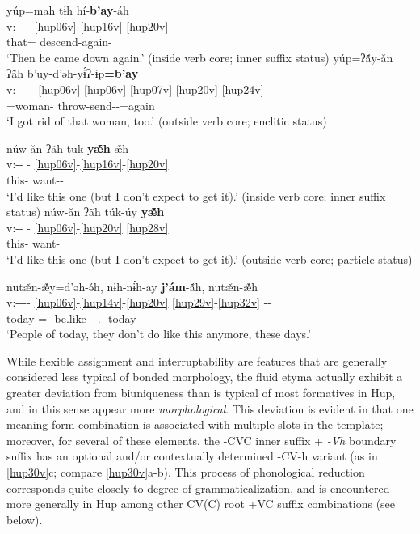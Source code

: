 \documentclass[output=paper]{langscibook}
\begin{document}
\ea\label{ex:hup:key:27}
    \ea\label{ex:hup:key:27a}{
    \glll yúp=mah tɨh hí-\textbf{b'ay}-áh\\ 
    v:{}-{}- -  \ref{hup06v}-\ref{hup16v}-\ref{hup20v}\\ 
    that=\Rep{} \Third\Sg{} descend-again-\Decl{}\\ 
    \glt `Then he came down again.' (inside verb core; inner suffix status)
    }
    \ex\label{ex:hup:key:27b}{
    \glll yúp=ʔ\'{ã}y-ǎn ʔãh b'uy-d'ǝh-yɨ́ʔ-ɨp\textbf{=b'ay}\\ 
    v:-{}-{}- - \ref{hup06v}-\ref{hup06v}-\ref{hup07v}-\ref{hup20v}-\ref{hup24v}\\ 
    \Dem{}=woman-\Obj{} \First\Sg{} throw-send-\Tel-\Dep{}=again\\  
    \glt `I got rid of that woman, too.' (outside verb core; enclitic status)
    }
    \z 
\z 

\ea\label{ex:hup:key:28} 
    \ea\label{ex:hup:key:28a}{
    \glll núw-ǎn ʔãh tuk-\textbf{yæ̃́́h}-æ̃́h\\ 
    v:-{}- - \ref{hup06v}-\ref{hup16v}-\ref{hup20v}\\ 
    this-\Obj{} \First\Sg{} want-\Frust-\Decl{}\\ 
    \glt `I'd like this one (but I don't expect to get it).' (inside verb core; inner suffix status)
    }
    \ex\label{ex:hup:key:28b}{
    \glll núw-ǎn ʔãh túk-úy \textbf{yæ̃́́h}\\ 
    v:-{}- - \ref{hup06v}-\ref{hup20v} \ref{hup28v}\\
    this-\Obj{} \First\Sg{} want-\Dynm{} \Frust{}\\
    \glt `I'd like this one (but I don't expect to get it).' (outside verb core; particle status)
    }
    \z 
\z 

\ea\label{ex:hup:key:29} 
\glll nutæ̌n-æ̃́y=d'ǝh-ǝ́h, nɨh-nɨ́h-ay \textbf{j'ám}-ã́h, nutæ̌n-æ̃́h	\\ 
v:-{}-{}-{}- \ref{hup06v}-\ref{hup14v}-\ref{hup20v} \ref{hup29v}-\ref{hup32v} -{}-\\ 
today-\Dynm=\Pl-\Decl{} be.like-\Neg-\Inch{} \Dst.\Cntr-\Decl{}  today-\Decl{}\\
\glt`People of today, they don't do like this anymore, these days.'
\z 

While flexible assignment and interruptability are features that are generally considered less typical of bonded morphology, the fluid etyma actually exhibit a greater deviation from biuniqueness than is typical of most formatives in Hup, and in this sense appear more \textit{morphological}. This deviation is evident in that one meaning-form combination is associated with multiple slots in the template; moreover, for several of these elements, the -CVC inner suffix + \textit{{}-\'{V}h} \textup{boundary suffix has an optional and/or contextually determined -CV-}h \textup{variant (as in \ref{hup30v}c; compare \ref{hup30v}a-b). This process of phonological reduction corresponds quite closely to degree of grammaticalization, and is encountered more generally in Hup among other CV(C) root +VC suffix combinations (see  below).}
\end{document}
